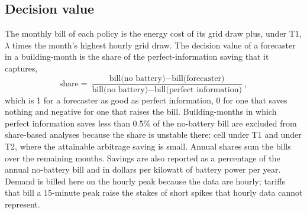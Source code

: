 \subsection{Decision value}
The monthly bill of each policy is the energy cost of its grid draw plus, under T1, $\lambda$ times the month's highest hourly grid draw. The decision value of a forecaster in a building-month is the share of the perfect-information saving that it captures,
\begin{equation}
\text{share}=\frac{\text{bill(no battery)}-\text{bill(forecaster)}}{\text{bill(no battery)}-\text{bill(perfect information)}},
\end{equation}
which is 1 for a forecaster as good as perfect information, 0 for one that saves nothing and negative for one that raises the bill. Building-months in which perfect information saves less than 0.5\% of the no-battery bill are excluded from share-based analyses because the share is unstable there:  cell under T1 and  under T2, where the attainable arbitrage saving is small. Annual shares sum the bills over the remaining months. Savings are also reported as a percentage of the annual no-battery bill and in dollars per kilowatt of battery power per year. Demand is billed here on the hourly peak because the data are hourly; tariffs that bill a 15-minute peak raise the stakes of short spikes that hourly data cannot represent.
